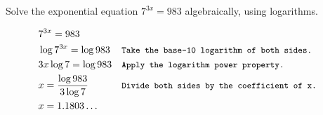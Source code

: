 \begin{example} Solve the exponential equation $7^{3 x}=983$ algebraically, using logarithms.

\begin{solution}
\begin{align*}
& 7^{3x} = 983  \\
& \log 7^{3x} = \log 983 && \texttt{\small Take the base-10 logarithm of both sides.} \\
& 3x \log 7 = \log 983 && \texttt{\small Apply the logarithm power property.} \\
& x = \frac{\log 983}{3 \log 7} && \texttt{\small Divide both sides by the coefficient of x.}\\
& x = 1.1803 \ldots   
\end{align*}


\end{solution}
    
\end{example}

